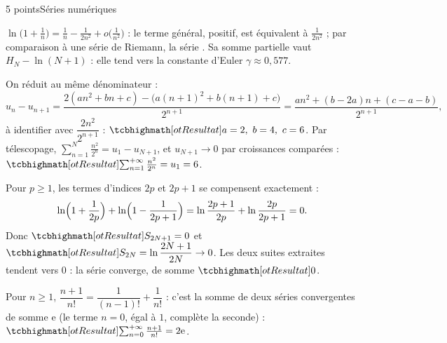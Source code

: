 \begin{corrigeEval}{5 points}{Séries numériques}
\begin{questions}
  \item $\ln\bigl(1+\frac1n\bigr)=\frac1n-\frac{1}{2n^{2}}+o\bigl(\frac{1}{n^{2}}\bigr)$ :
    le terme général, positif, est équivalent à $\frac{1}{2n^{2}}$ ;
    par comparaison à une série de Riemann, la série
    . Sa somme partielle vaut
    $H_N-\ln(N+1)$ : elle tend vers la constante d'Euler
    $\gamma\approx0{,}577$. \pts{1 pt}
  \item On réduit au même dénominateur :
    \[u_n-u_{n+1}=\frac{2(an^{2}+bn+c)-\bigl(a(n+1)^{2}+b(n+1)+c\bigr)}{2^{n+1}}
      =\frac{an^{2}+(b-2a)n+(c-a-b)}{2^{n+1}},\]
    à identifier avec $\dfrac{2n^{2}}{2^{n+1}}$ : $\res{a=2,\ b=4,\ c=6}$.
    Par télescopage,
    $\sum_{n=1}^{N}\frac{n^{2}}{2^{n}}=u_1-u_{N+1}$, et $u_{N+1}\to0$ par
    croissances comparées : $\res{\sum_{n=1}^{+\infty}\frac{n^{2}}{2^{n}}=u_1=6}$.
  \item Pour $p\geqslant1$, les termes d'indices $2p$ et $2p+1$ se
    compensent exactement :
    \[\ln\Bigl(1+\frac{1}{2p}\Bigr)+\ln\Bigl(1-\frac{1}{2p+1}\Bigr)
      =\ln\frac{2p+1}{2p}+\ln\frac{2p}{2p+1}=0.\]
    Donc $\res{S_{2N+1}=0}$ et $\res{S_{2N}=\ln\dfrac{2N+1}{2N}}\to0$. Les
    deux suites extraites tendent vers $0$ : la série converge, de somme
    $\res{0}$. 
  \item Pour $n\geqslant1$, $\dfrac{n+1}{n!}=\dfrac{1}{(n-1)!}+\dfrac{1}{n!}$ :
    c'est la somme de deux séries convergentes de somme $\mathrm{e}$ (le
    terme $n=0$, égal à $1$, complète la seconde) :
    $\res{\sum_{n=0}^{+\infty}\frac{n+1}{n!}=2\mathrm{e}}$. \pts{1 pt}
\end{questions}
\end{corrigeEval}

